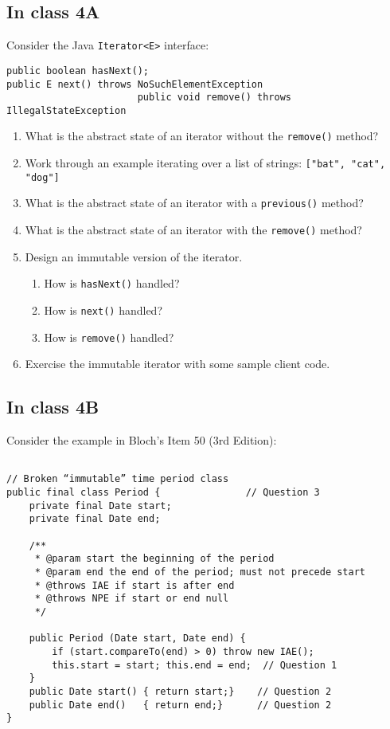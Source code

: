 \documentclass[11pt]{article}
\begin{document}
\subsection{In class 4A}
\label{sec:org873a6b0}
Consider the Java \texttt{Iterator<E>} interface:

\begin{verbatim}
public boolean hasNext();
public E next() throws NoSuchElementException
                       public void remove() throws IllegalStateException
\end{verbatim}

\begin{enumerate}
\item What is the abstract state of an iterator without the \texttt{remove()} method?
\item Work through an example iterating over a list of strings: \texttt{["bat", "cat", "dog"]}
\item What is the abstract state of an iterator with a \texttt{previous()} method?
\item What is the abstract state of an iterator with the \texttt{remove()} method?
\item Design an immutable version of the iterator.
\begin{enumerate}
\item How is \texttt{hasNext()} handled?
\item How is \texttt{next()} handled?
\item How is \texttt{remove()} handled?
\end{enumerate}
\item Exercise the immutable iterator with some sample client code.
\end{enumerate}

\subsection{In class 4B}
\label{sec:org8a1b731}
Consider the example in Bloch's Item 50 (3rd Edition):

\begin{verbatim}

// Broken “immutable” time period class
public final class Period {               // Question 3
    private final Date start;
    private final Date end;

    /**
     * @param start the beginning of the period
     * @param end the end of the period; must not precede start
     * @throws IAE if start is after end
     * @throws NPE if start or end null
     */

    public Period (Date start, Date end) {
        if (start.compareTo(end) > 0) throw new IAE();
        this.start = start; this.end = end;  // Question 1
    }
    public Date start() { return start;}    // Question 2
    public Date end()   { return end;}      // Question 2
}
\end{verbatim}
\end{document}
